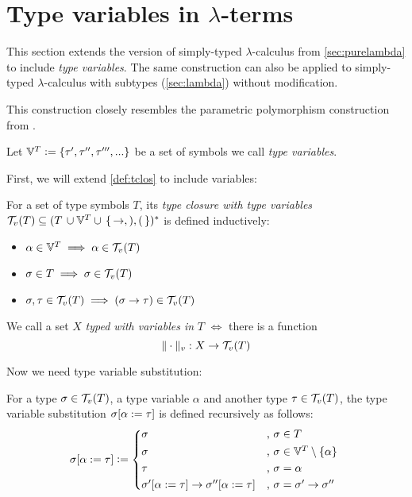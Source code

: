 \documentclass[main.tex]{subfiles}
\begin{document}
\section{Type variables in $\lambda$-terms}
\label{lambda:typevars}

This section extends the version of simply-typed $\lambda$-calculus from
\cref{sec:purelambda} to include \emph{type variables}. The same construction
can also be applied to simply-typed $\lambda$-calculus with subtypes
(\cref{sec:lambda}) without modification.

This construction closely resembles the parametric polymorphism construction
from \cite[chap.~25]{pierce}.

Let $\mathbb{V}^{T} \vcentcolon= \{ \tau', \tau'', \tau''', ... \}$ be a set of symbols we
call \emph{type variables}.

First, we will extend \cref{def:tclos} to include variables:
\begin{defn}
    For a set of type symbols $T$, its \emph{type closure with type variables}
    $\mathcal{T}_v( T ) \subseteq (T \, \cup \mathbb{V}^{T} \cup \,\{\, \rightarrow, ), ( \,\})^*$ is defined
    inductively:

    \begin{itemize}
        \item $\alpha \in \mathbb{V}^{T} \implies \alpha \in \mathcal{T}_v( T )$
        \item $\sigma \in T \implies \sigma \in \mathcal{T}_v( T )$
        \item $\sigma, \tau \in \mathcal{T}_v( T ) \implies (\sigma \rightarrow \tau) \in \mathcal{T}_v( T )$
    \end{itemize}
\end{defn}

\begin{defn}
    We call a set $X$ \emph{typed with variables in} $T$ $\iff$ there is a function
    \[ \|\cdot\|_v : X \rightarrow \mathcal{T}_v( T ) \]
\end{defn}

Now we need type variable substitution:
\begin{defn}
    For a type $\sigma \in \mathcal{T}_v( T )$, a type variable $\alpha$ and another
    type $\tau \in \mathcal{T}_v( T )$, the type variable substitution 
    $\sigma [ \alpha := \tau ]$ is defined recursively as follows:
    \[
        \subst{\sigma}{\alpha}{\tau} \defeq
        \begin{cases*}
            \sigma &, $\sigma \in T$ \\
            \sigma &, $\sigma \in \tvars \setminus \{ \alpha \}$ \\
            \tau &, $\sigma = \alpha$ \\
            \subst{\sigma'}{\alpha}{\tau} \tot \subst{\sigma''}{\alpha}{\tau}
                &, $\sigma = \sigma' \tot \sigma''$ \\
        \end{cases*}
    \]
\end{defn}
\end{document}
